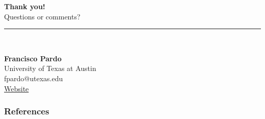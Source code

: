 \documentclass{beamer}
\begin{document}
\begin{frame}
    \hypersetup{citecolor=blue}
  \centering
  \vspace{2cm}
  {\Huge \textbf{Thank you!}} \\[1cm]
  
  {\Large Questions or comments?} \\[0.5cm]
  
  \rule{0.4\linewidth}{0.4pt} \\[0.5cm]
  
  \begin{flushleft}
    \textbf{Francisco Pardo} \\
    University of Texas at Austin \\
    fpardo@utexas.edu \\
    \href{https://francisco-pardo-pajuelo.github.io/}{Website}
  \end{flushleft}
\end{frame}


\begin{frame}[allowframebreaks]
    \frametitle{References}
    \small
    \tiny  %
\end{frame}
\end{document}
